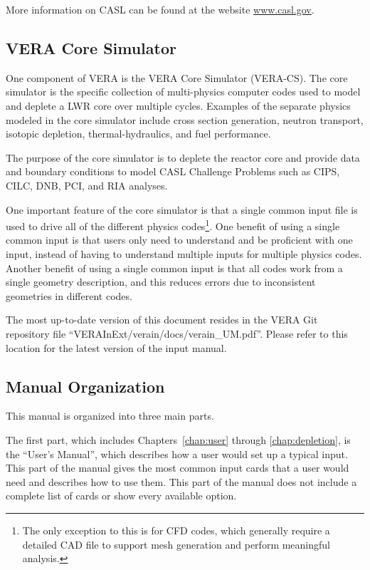 More information on CASL can be found at the website \href{http://www.casl.gov}{www.casl.gov}.

\subsection{VERA Core Simulator}
One component of VERA is the VERA Core Simulator (VERA-CS).  The core simulator is the specific collection
of multi-physics computer codes used to model and deplete a LWR core over multiple cycles.
Examples of the separate physics modeled in the core simulator include cross section generation,
neutron transport, isotopic depletion, thermal-hydraulics, and fuel performance.

The purpose of the core simulator is to deplete the reactor core and provide data and boundary conditions to model
CASL Challenge Problems such as CIPS, CILC, DNB, PCI, and RIA analyses.

One important feature of the core simulator is that a single common input file is used to drive all
of the different physics codes\footnote{The only exception to this is for CFD codes,
which generally require a detailed CAD file to support mesh generation and perform meaningful analysis.}.
One benefit of using a single common input is that users only need to understand and be proficient with one input,
instead of having to understand multiple inputs for multiple physics codes.
Another benefit of using a single common input is that all codes work from a single
geometry description, and this reduces errors due to inconsistent geometries in different codes.

The most up-to-date version of this document resides in the VERA Git repository file
``VERAInExt/verain/docs/verain\_UM.pdf''.
Please refer to this location for the latest version of the input manual.


\subsection{Manual Organization}

This manual is organized into three main parts.

The first part, which includes Chapters~\ref{chap:user} through \ref{chap:depletion}, is the ``User's Manual'',
which describes how a user would set up a typical input.  This part of the manual gives
the most common input cards that a user would need and describes how to use them.
This part of the manual does not include a complete list of cards or show every available option.

